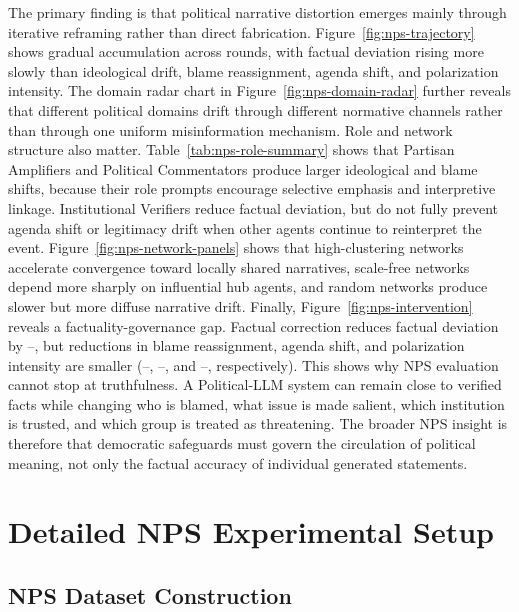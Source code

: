 The primary finding is that political narrative distortion emerges mainly through iterative reframing rather than direct fabrication. Figure~\ref{fig:nps-trajectory} shows gradual accumulation across rounds, with factual deviation rising more slowly than ideological drift, blame reassignment, agenda shift, and polarization intensity. The domain radar chart in Figure~\ref{fig:nps-domain-radar} further reveals that different political domains drift through different normative channels rather than through one uniform misinformation mechanism. Role and network structure also matter. Table~\ref{tab:nps-role-summary} shows that Partisan Amplifiers and Political Commentators produce larger ideological and blame shifts, because their role prompts encourage selective emphasis and interpretive linkage. Institutional Verifiers reduce factual deviation, but do not fully prevent agenda shift or legitimacy drift when other agents continue to reinterpret the event. Figure~\ref{fig:nps-network-panels} shows that high-clustering networks accelerate convergence toward locally shared narratives, scale-free networks depend more sharply on influential hub agents, and random networks produce slower but more diffuse narrative drift. Finally, Figure~\ref{fig:nps-intervention} reveals a factuality-governance gap. Factual correction reduces factual deviation by --, but reductions in blame reassignment, agenda shift, and polarization intensity are smaller (--, --, and --, respectively). This shows why NPS evaluation cannot stop at truthfulness. A Political-LLM system can remain close to verified facts while changing who is blamed, what issue is made salient, which institution is trusted, and which group is treated as threatening. The broader NPS insight is therefore that democratic safeguards must govern the circulation of political meaning, not only the factual accuracy of individual generated statements.



\section{Detailed NPS Experimental Setup}
\label{appendix:nps-setup}

\subsection{NPS Dataset Construction}
\label{appendix:nps-dataset}

